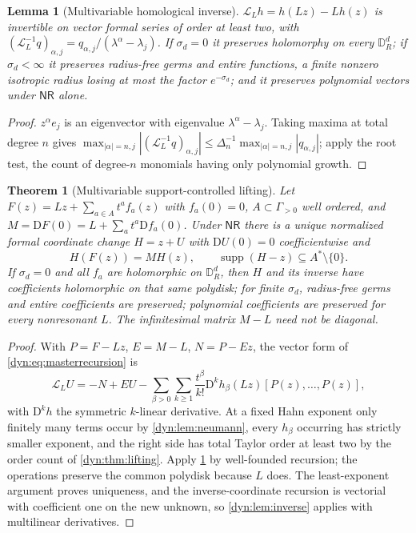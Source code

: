 \documentclass[11pt,letterpaper]{article}
\newtheorem{theorem}{Theorem}[section]
\newtheorem{lemma}[lemma]{Lemma}
\theoremstyle{definition}
\theoremstyle{remark}
\newcommand{\supp}{\operatorname{supp}}
\newcommand{\Li}{\mathcal L}
\newcommand{\nres}{\mathsf{NR}}
\numberwithin{equation}{section}
\begin{document}
\begin{lemma}[Multivariable homological inverse]\label{dyn:lem:multihomological}
$\Li_Lh=h(Lz)-Lh(z)$ is invertible on vector formal series of order at
least two, with $(\Li_L^{-1}q)_{\alpha,j}=q_{\alpha,j}/(\lambda^{\alpha}-\lambda_j)$.
If $\sigma_d=0$ it preserves holomorphy on every $\mathbb D_R^{d}$; if
$\sigma_d<\infty$ it preserves radius-free germs and entire functions, a
finite nonzero isotropic radius losing at most the factor $e^{-\sigma_d}$;
and it preserves polynomial vectors under $\nres$ alone.
\end{lemma}
\begin{proof}
$z^{\alpha}e_j$ is an eigenvector with eigenvalue
$\lambda^{\alpha}-\lambda_j$. Taking maxima at total degree $n$ gives
$\max_{|\alpha|=n,j}|(\Li_L^{-1}q)_{\alpha,j}|\le\Delta_n^{-1}
\max_{|\alpha|=n,j}|q_{\alpha,j}|$; apply the root test, the count of
degree-$n$ monomials having only polynomial growth.
\end{proof}

\begin{theorem}[Multivariable support-controlled lifting]\label{dyn:thm:multilifting}
Let $F(z)=Lz+\sum_{a\in A}t^{a}f_a(z)$ with $f_a(0)=0$, $A\subset\Gamma_{>0}$
well ordered, and $M=\mathrm DF(0)=L+\sum_at^{a}\mathrm Df_a(0)$. Under
$\nres$ there is a unique normalized formal coordinate change $H=z+U$ with
$\mathrm DU(0)=0$ coefficientwise and
\begin{equation}\label{dyn:eq:multischroeder}
 H(F(z))=MH(z),\qquad \supp(H-z)\subseteq A^{*}\setminus\{0\}.
\end{equation}
If $\sigma_d=0$ and all $f_a$ are holomorphic on $\mathbb D_R^{d}$, then
$H$ and its inverse have coefficients holomorphic on that \emph{same}
polydisk; for finite $\sigma_d$, radius-free germs and entire coefficients
are preserved; polynomial coefficients are preserved for every nonresonant
$L$. The infinitesimal matrix $M-L$ need \emph{not} be diagonal.
\end{theorem}
\begin{proof}
With $P=F-Lz$, $E=M-L$, $N=P-Ez$, the vector form of
\eqref{dyn:eq:masterrecursion} is
\begin{equation}\label{dyn:eq:multimaster}
 \Li_LU=-N+EU-\sum_{\beta>0}\sum_{k\ge1}\frac{t^{\beta}}{k!}
 \mathrm D^{k}h_\beta(Lz)[P(z),\dots,P(z)] ,
\end{equation}
with $\mathrm D^{k}h$ the symmetric $k$-linear derivative. At a fixed Hahn
exponent only finitely many terms occur by \cref{dyn:lem:neumann}, every
$h_\beta$ occurring has strictly smaller exponent, and the right side has
total Taylor order at least two by the order count of
\cref{dyn:thm:lifting}. Apply \cref{dyn:lem:multihomological} by
well-founded recursion; the operations preserve the common polydisk because
$L$ does. The least-exponent argument proves uniqueness, and the
inverse-coordinate recursion is vectorial with coefficient one on the new
unknown, so \cref{dyn:lem:inverse} applies with multilinear derivatives.
\end{proof}
\end{document}
